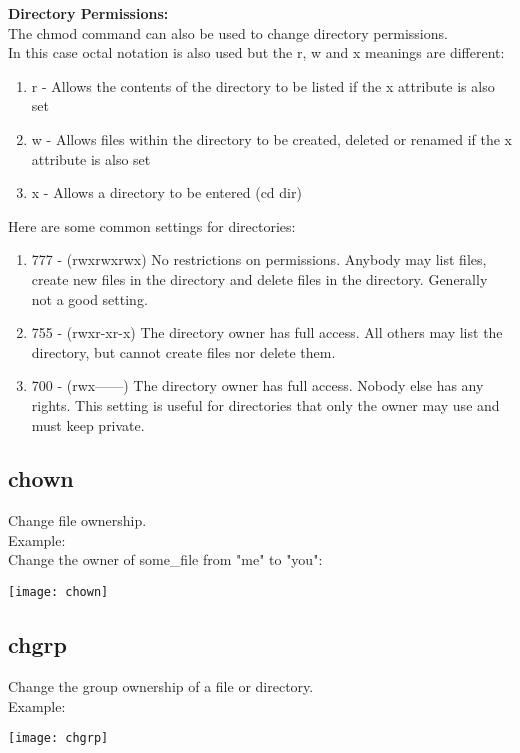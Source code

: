 \documentclass[12pt, letterpaper]{report}
\begin{document}
\textbf{Directory Permissions:}\\
The chmod command can also be used to change directory permissions.\\
In this case octal notation is also used but the r, w and x meanings
are different:
\begin{enumerate}
	\item r - Allows the contents of the directory to be listed if the x attribute is also set
	\item w - Allows files within the directory to be created, deleted or renamed if the x attribute is also set
	\item x - Allows a directory to be entered (cd dir)
\end{enumerate}
Here are some common settings for directories:
\begin{enumerate}
	\item 777 - (rwxrwxrwx) No restrictions on permissions. Anybody may list files, create new files in the directory and delete files in the directory. Generally not a good setting.
	\item 755 - (rwxr-xr-x) The directory owner has full access. All others may list the directory, but cannot create files nor delete them.
	\item 700 - (rwx------) The directory owner has full access. Nobody else has any rights. This setting is useful for directories that only the owner may use and must keep private.
\end{enumerate}

\subsection{chown}
Change file ownership.\\
Example:\\
Change the owner of some\_file from "me" to "you":
\begin{center}
\texttt{[image: chown]}
\end{center}

\subsection{chgrp}
Change the group ownership of a file or directory.\\
Example:\\
\begin{center}
\texttt{[image: chgrp]}
\end{center}
\end{document}
